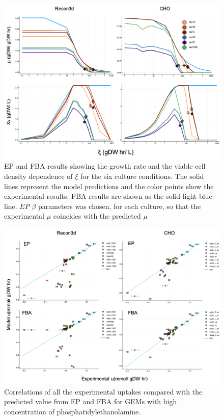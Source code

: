 	\begin{figure}[h]
		\includegraphics[scale = 0.5]{rich_medium_1}
		\caption{EP and FBA results showing the growth rate and the viable cell density dependence of $\xi$ for the six culture conditions. The solid lines represent the model predictions and the color points show the experimental results. FBA results are shown as the solid light blue line. $EP$ $\beta$ parameters was chosen, for each culture, so that the experimental $\mu$ coincides with the predicted $\mu$}
		
	\end{figure}
	
	\begin{figure}[h]
		\includegraphics[scale = 0.5]{rich_medium_2}
		\caption{Correlations of all the experimental uptakes compared with the predicted value from EP and FBA for GEMs with high concentration of phosphatidylethanolamine.}
		
	\end{figure}
	
